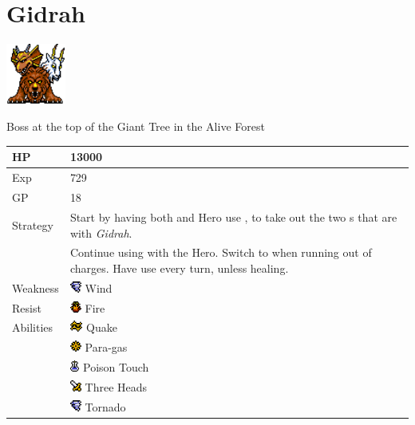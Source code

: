 \section{Gidrah}
\label{monster:gidrah}

\includegraphics[height=2cm,keepaspectratio]{./resources/monster/gidrah}

Boss at the top of the Giant Tree in the Alive Forest

\begin{longtable}{ l p{9cm} }
	HP
	& 13000
\\ \hline
	Exp
	& 729
\\ \hline
	GP
	& 18
\\ \hline
	Strategy
	& Start by having both \nameref{char:kaeli} and Hero use \nameref{spell:aero}, to take out the two \nameref{monster:skuldier}s that are with \textit{Gidrah}. \\
	& Continue using \nameref{spell:aero} with the Hero. Switch to \nameref{spell:white} when running out of charges. Have \nameref{char:kaeli} use \nameref{spell:aero} every turn, unless healing.
\\ \hline
	Weakness
	& \includegraphics[height=1em,keepaspectratio]{./resources/effects/wind} Wind
\\ \hline
	Resist
	& \includegraphics[height=1em,keepaspectratio]{./resources/effects/fire} Fire
\\ \hline
	Abilities
	& \includegraphics[height=1em,keepaspectratio]{./resources/effects/earth} Quake \\
	& \includegraphics[height=1em,keepaspectratio]{./resources/effects/paralyze} Para-gas \\
	& \includegraphics[height=1em,keepaspectratio]{./resources/effects/poison} Poison Touch \\
	& \includegraphics[height=1em,keepaspectratio]{./resources/effects/damage} Three Heads \\
	& \includegraphics[height=1em,keepaspectratio]{./resources/effects/wind} Tornado
\end{longtable}
